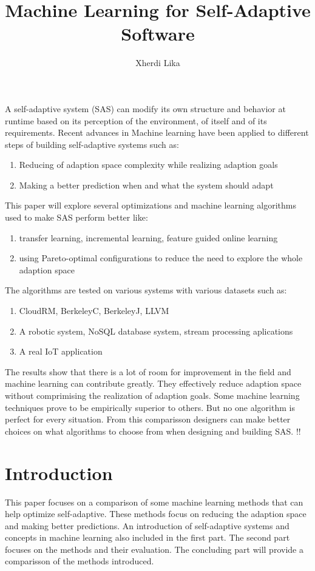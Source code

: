 \documentclass[pdftex,english,oribibl]{llncs}
\title{Machine Learning for Self-Adaptive Software}
\author{Xherdi Lika}
\institute{Humboldt University of Berlin\\Department of Computer Science\\12489 Berlin, Germany}
\makeatletter
\gdef\@keywords{}
\renewenvironment{abstract}{%
	\list{}{\advance\topsep by0.35cm\relax\small%
		\leftmargin=1cm%
		\labelwidth=\z@%
		\listparindent=\z@%
		\itemindent\listparindent%
		\rightmargin\leftmargin}%
	\item[\hskip\labelsep\bfseries\abstractname]}{%
	\if!\@keywords!\else{\item[~]\item[\hskip\labelsep\bfseries\keywordname]\@keywords}\fi%
	\endlist}
\makeatother
\begin{document}
\sffamily
\maketitle

\begin{abstract}\footnotesize
	A self-adaptive system (SAS) can modify its own structure and behavior at runtime
	based on its perception of the environment, of itself and of its
	requirements. Recent advances in Machine learning have been applied to
	different steps of building self-adaptive systems such as:
	\begin{enumerate}
		\item Reducing of adaption space complexity while realizing adaption goals
		\item Making a better prediction when and what the system should adapt 
	\end{enumerate}
	This paper will explore several optimizations and machine learning algorithms used
	to make SAS perform better like:
	\begin{enumerate}
		\item transfer learning, incremental learning, feature guided online learning
		\item using Pareto-optimal configurations to reduce the need to explore the
		      whole adaption space
	\end{enumerate}
	The algorithms are tested on various systems with various datasets such as:
	\begin{enumerate}
		\item CloudRM, BerkeleyC, BerkeleyJ, LLVM
		\item A robotic system, NoSQL database system, stream processing aplications
		\item A real IoT application
	\end{enumerate}
	The results show that there is a lot of room for improvement in the field
	and machine learning can contribute greatly. They effectively reduce
	adaption space  without comprimising the realization of adaption goals. Some
	machine learning techniques prove to be empirically superior to others. But
	no one algorithm is perfect for every situation. From this comparisson designers
	can make better choices on what algorithms to choose from when designing and
	building SAS.
\end{abstract}

\section{Introduction}
This paper focuses on a comparison of some machine learning methods that can help optimize self-adaptive. These methods focus on reducing the adaption space and making better predictions. An introduction of self-adaptive systems and concepts in machine learning also included in the first part. The second part focuses on the methods and their evaluation. The concluding part will provide a comparisson of the methods introduced.
\end{document}
